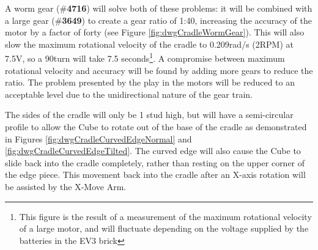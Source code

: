 \documentclass{report}
\newcommand{\legopiece}[1]{(\#\textbf{#1})}
\begin{document}
    A worm gear \legopiece{4716} will solve both of these problems: it will be combined with a large gear \legopiece{3649} to create a gear ratio of 1:40, increasing the accuracy of the motor by a factor of forty (see Figure \ref{fig:dwgCradleWormGear}). This will also slow the maximum rotational velocity of the cradle to 0.209rad/s (2RPM) at 7.5V, so a 90\degree turn will take 7.5 seconds\footnote{This figure is the result of a measurement of the maximum rotational velocity of a large motor, and will fluctuate depending on the voltage supplied by the batteries in the EV3 brick}. A compromise between maximum rotational velocity and accuracy will be found by adding more gears to reduce the ratio. The problem presented by the play in the motors will be reduced to an acceptable level due to the unidirectional nature of the gear train.
    
    The sides of the cradle will only be 1 stud high, but will have a semi-circular profile to allow the Cube to rotate out of the base of the cradle as demonstrated in Figures \ref{fig:dwgCradleCurvedEdgeNormal} and \ref{fig:dwgCradleCurvedEdgeTilted}. The curved edge will also cause the Cube to slide back into the cradle completely, rather than resting on the upper corner of the edge piece. This movement back into the cradle after an X-axis rotation will be assisted by the X-Move Arm.
    
\end{document}
